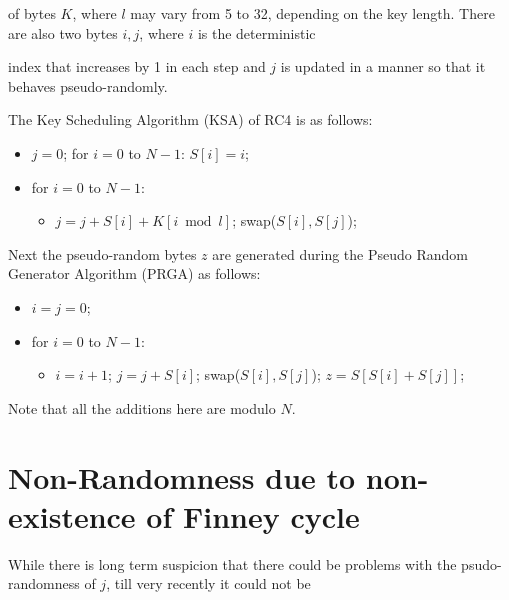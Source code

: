 \documentclass{llncs}
\begin{document}
of bytes $K$, where $l$ may vary from 5 to 32, depending on the key length. There are also two bytes $i, j$, where $i$ is the deterministic

index that increases by 1 in each step and $j$ is updated in a manner so that it behaves pseudo-randomly.

The Key Scheduling Algorithm (KSA) of RC4 is as follows:

\begin{itemize}

\item $j = 0$; for $i = 0$ to $N-1$: $S[i] = i$; 

\item for $i = 0$ to $N-1$:

\begin{itemize}

\item[] $j = j + S[i] + K[i \bmod l]$; swap($S[i], S[j]$);

\end{itemize}

\end{itemize}

Next the pseudo-random bytes $z$ are generated during the Pseudo Random Generator Algorithm (PRGA) as follows:

\begin{itemize}

\item $i = j = 0$;

\item for $i = 0$ to $N-1$:

\begin{itemize}

\item[] $i = i+1$; $j = j + S[i]$; swap($S[i], S[j]$); $z = S[S[i]+S[j]]$; 

\end{itemize}

\end{itemize}

Note that all the additions here are modulo $N$.



\section{Non-Randomness due to non-existence of Finney cycle}

While there is long term suspicion that there could be problems with the psudo-randomness of $j$, till very recently it could not be 
\end{document}
